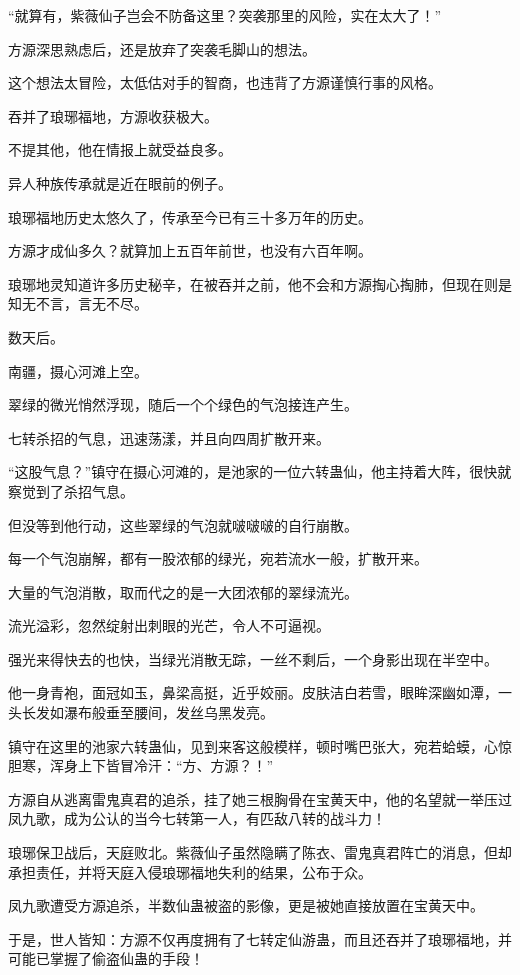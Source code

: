 \begin{this_body}
“就算有，紫薇仙子岂会不防备这里？突袭那里的风险，实在太大了！”

方源深思熟虑后，还是放弃了突袭毛脚山的想法。

这个想法太冒险，太低估对手的智商，也违背了方源谨慎行事的风格。

吞并了琅琊福地，方源收获极大。

不提其他，他在情报上就受益良多。

异人种族传承就是近在眼前的例子。

琅琊福地历史太悠久了，传承至今已有三十多万年的历史。

方源才成仙多久？就算加上五百年前世，也没有六百年啊。

琅琊地灵知道许多历史秘辛，在被吞并之前，他不会和方源掏心掏肺，但现在则是知无不言，言无不尽。

数天后。

南疆，摄心河滩上空。

翠绿的微光悄然浮现，随后一个个绿色的气泡接连产生。

七转杀招的气息，迅速荡漾，并且向四周扩散开来。

“这股气息？”镇守在摄心河滩的，是池家的一位六转蛊仙，他主持着大阵，很快就察觉到了杀招气息。

但没等到他行动，这些翠绿的气泡就啵啵啵的自行崩散。

每一个气泡崩解，都有一股浓郁的绿光，宛若流水一般，扩散开来。

大量的气泡消散，取而代之的是一大团浓郁的翠绿流光。

流光溢彩，忽然绽射出刺眼的光芒，令人不可逼视。

强光来得快去的也快，当绿光消散无踪，一丝不剩后，一个身影出现在半空中。

他一身青袍，面冠如玉，鼻梁高挺，近乎姣丽。皮肤洁白若雪，眼眸深幽如潭，一头长发如瀑布般垂至腰间，发丝乌黑发亮。

镇守在这里的池家六转蛊仙，见到来客这般模样，顿时嘴巴张大，宛若蛤蟆，心惊胆寒，浑身上下皆冒冷汗：“方、方源？！”

方源自从逃离雷鬼真君的追杀，挂了她三根胸骨在宝黄天中，他的名望就一举压过凤九歌，成为公认的当今七转第一人，有匹敌八转的战斗力！

琅琊保卫战后，天庭败北。紫薇仙子虽然隐瞒了陈衣、雷鬼真君阵亡的消息，但却承担责任，并将天庭入侵琅琊福地失利的结果，公布于众。

凤九歌遭受方源追杀，半数仙蛊被盗的影像，更是被她直接放置在宝黄天中。

于是，世人皆知：方源不仅再度拥有了七转定仙游蛊，而且还吞并了琅琊福地，并可能已掌握了偷盗仙蛊的手段！


\end{this_body}
